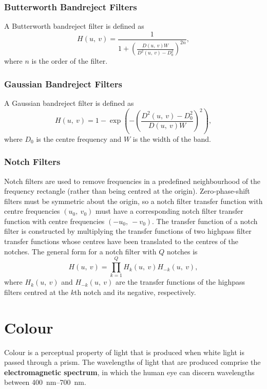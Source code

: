 \documentclass{article}
\begin{document}
\subsubsection{Butterworth Bandreject Filters}
A Butterworth bandreject filter is defined as
\begin{equation*}
    H\left( u,\: v \right) = \frac{1}{1 + \left( \frac{D\left( u,\: v \right)W}{D^2\left( u,\: v \right) - D_0^2} \right)^{2n}},
\end{equation*}
where \(n\) is the order of the filter.
\subsubsection{Gaussian Bandreject Filters}
A Gaussian bandreject filter is defined as
\begin{equation*}
    H\left( u,\: v \right) = 1 - \exp{\left( - \left( \frac{D^2\left( u,\: v \right) - D_0^2}{D\left( u,\: v \right)W} \right)^2 \right)},
\end{equation*}
where \(D_0\) is the centre frequency and \(W\) is the width of the band.
\subsubsection{Notch Filters}
Notch filters are used to remove frequencies in a predefined
neighbourhood of the frequency rectangle (rather than being centred at
the origin). Zero-phase-shift filters must be symmetric about the
origin, so a notch filter transfer function with centre frequencies
\(\left( u_0,\: v_0 \right)\) must have a corresponding notch filter
transfer function with centre frequencies \(\left( -u_0,\: -v_0
\right)\). The transfer function of a notch filter is constructed by
multiplying the transfer functions of two highpass filter transfer
functions whose centres have been translated to the centres of the
notches. The general form for a notch filter with \(Q\) notches is
\begin{equation*}
    H\left( u,\: v \right) = \prod_{k=1}^Q H_k\left( u,\: v \right) H_{-k}\left( u,\: v \right),
\end{equation*}
where \(H_k\left( u,\: v \right)\) and \(H_{-k}\left( u,\: v \right)\)
are the transfer functions of the highpass filters centred at the
\(k\)th notch and its negative, respectively.
\section{Colour}
Colour is a perceptual property of light that is produced when white
light is passed through a prism. The wavelengths of light that are
produced comprise the \textbf{electromagnetic spectrum}, in which the
human eye can discern wavelengths between \qtyrange[range-phrase={ and
}]{400}{700}{nm}.
\end{document}
